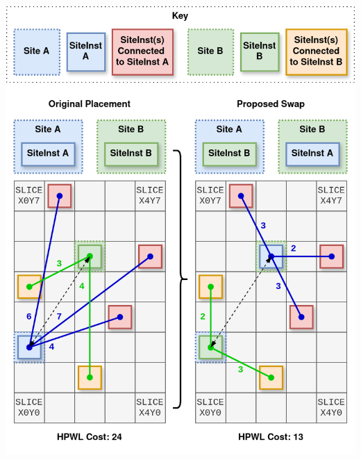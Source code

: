 {
    \centering
    \includegraphics[width=\columnwidth]{figures/placement/swapSingleSite.png}
    \label{fig:swapSingleSite}
}




